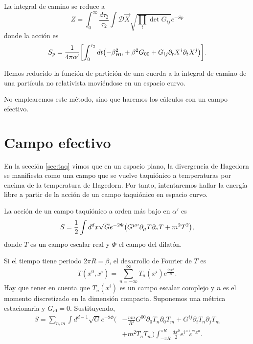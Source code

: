 La integral de camino se reduce a 
\begin{equation}
  Z=\int_0^\infty \frac{d\tau_2}{\tau_2}\int \mathcal D \vec {X} \sqrt{\prod_t \det G_{ij}}e^{-Sp}
  \label{eq:final}
\end{equation}
donde la acción es
\begin{equation}
  S_p=\frac{1}{4\pi\alpha'}\qty[\int_0^{\tau_2}dt \qty(-\beta^2_{H0}+\beta^2 G_{00}+G_{ij}\partial_t X^i\partial_t X^j)].
\end{equation}

Hemos reducido la función de partición de una cuerda a la integral de camino de
una partícula no relativista moviéndose en un espacio curvo.

No emplearemos este método, sino que haremos los cálculos con un campo efectivo.

\section{Campo efectivo}
En la sección \ref{sec:taq} vimos que en un espacio plano, la divergencia de Hagedorn se manifiesta
como una campo que se vuelve taquiónico a temperaturas por encima de la temperatura de
Hagedorn.
Por tanto, intentaremos hallar la energía libre a partir de la acción de un campo taquiónico
en espacio curvo.

La acción de un campo taquiónico a orden más bajo en $\alpha'$ es
\begin{equation}
  S=\frac{1}{2}\int d^d x\sqrt G e^{-2\Phi}  \qty(G^{\mu\nu}\partial_\mu T\partial_\nu T+m^2T^2),
\end{equation}
donde $T$ es un campo escalar real y $\Phi$ el campo del dilatón.

Si el tiempo tiene periodo $2\pi R=\beta$, el desarrollo de Fourier de $T$ es
\begin{equation}
  T(x^0,x^i)=\sum_{n=-\infty}^{\infty} T_n(x^i)e^{\frac{inx^0}{R}}.
\end{equation}
Hay que tener en cuenta que $T_n(x^i)$ es un campo escalar complejo
y $n$ es el momento discretizado en la dimensión compacta.
Suponemos una métrica estacionaria y $G_{i0}=0$.
Sustituyendo,
\begin{equation}
  \begin{aligned}
    S=\sum_{n,m} \int d^{d-1} \sqrt{G}e^{-2\Phi}\biggl(&-\frac{nm}{R^2}G^{00}\partial_0 T_n \partial_0 T_{m} 
    + G^{ij}\partial_i T_n \partial_j T_{m} \\
    &+ m^2 T_n T_{m}\biggl) \int_{-\pi R}^{\pi R} \frac{dx^0}{2}e^{i\frac{n+m}{R}x^0}.
  \end{aligned}
\end{equation}


